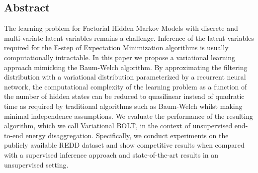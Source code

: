 
\subsection{Abstract}
The learning problem for Factorial Hidden Markov Models with discrete and multi-variate latent variables remains a challenge. Inference of the latent variables required for the E-step of Expectation Minimization algorithms is usually computationally intractable. In this paper we propose a variational learning approach mimicking the Baum-Welch algorithm. By approximating the filtering distribution with a variational distribution parameterized by a recurrent neural network, the computational complexity of the learning problem as a function of the number of hidden states can be reduced to quasilinear instead of quadratic time as required by traditional algorithms such as Baum-Welch whilst making minimal independence assumptions. We evaluate the performance of the resulting algorithm, which we call Variational BOLT, in the context of unsupervised end-to-end energy disaggregation. Specifically, we conduct experiments on the publicly available REDD dataset and show competitive results when compared with a supervised inference approach and state-of-the-art results in an unsupervised setting.


